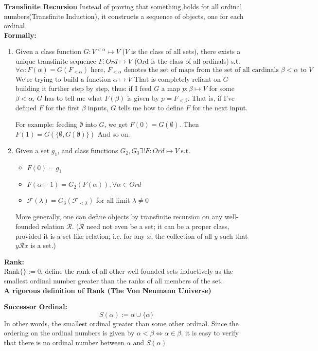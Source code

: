 \documentclass{article}
\newcommand{\0}{{\bf{0}}}
\begin{document}
\textbf{Transfinite Recursion}
Instead of proving that something holds for all ordinal numbers(Transfinite Induction), it constructs a sequence of objects, one for each ordinal\\
\textbf{Formally:}
\begin{enumerate}
    \item Given a class function $G:V^{<\alpha}\mapsto V$ ($V$ is the class of all sets), there exists a unique transfinite sequence $F:Ord\mapsto V$ (Ord is the class of all ordinals) s.t. 
    $$\forall\alpha:F(\alpha )=G(F_{<\alpha})\mbox{ here, }F_{<\alpha}\mbox{ denotes the set of maps from the set of all cardinals $\beta<\alpha$ to $V$}$$
    We're trying to build a function $\alpha\mapsto V$ That is completely reliant on $G$ building it further step by step, thus: if I feed $G$ a map $p:\beta\mapsto V$ for some $\beta<\alpha$, $G$ has to tell me what $F(\beta)$ is given by $p=F_{<\beta}$. That is, if I've defined $F$ for the first $\beta$ inputs, $G$ tells me how to define $F$ for the next input.
    
    For example: feeding $\emptyset$ into $G$, we get $F(0)=G(\emptyset)$. Then $F(1)=G(\{\emptyset,G(\emptyset)\})$ And so on.
    \item Given a set $g_1$, and class functions $G_2,G_3\exists!F:Ord\mapsto V$ s.t.
    \begin{itemize}
        \item $F(0) = g_1$
        \item $F(\alpha+1)=G_2(F(\alpha)),\forall\alpha\in Ord$
        \item $\mathcal{F}(\lambda )=G_3(\mathcal{F}_{<\lambda})$ for all limit $\lambda\neq0$
    \end{itemize}
    More generally, one can define objects by transfinite recursion on any well-founded relation $\mathcal{R}$. ($\mathcal{R}$ need not even be a set; it can be a proper class, provided it is a set-like relation; i.e. for any $x$, the collection of all $y$ such that $y\mathcal{R}x$ is a set.)
\end{enumerate}
\textbf{Rank:}\\
Rank$\{\}:=0$, define the rank of all other well-founded sets inductively as the smallest ordinal number greater than the ranks of all members of the set. \\
\textbf{A rigorous definition of Rank (The Von Neumann Universe)}

\textbf{Successor Ordinal:}
$$S(\alpha):=\alpha\cup\{\alpha \}$$
In other words, the smallest ordinal greater than some other ordinal.
Since the ordering on the ordinal numbers is given by $\alpha<\beta\iff\alpha\in\beta$, it is easy to verify that there is no ordinal number between $\alpha$ and $S(\alpha)$
\end{document}
